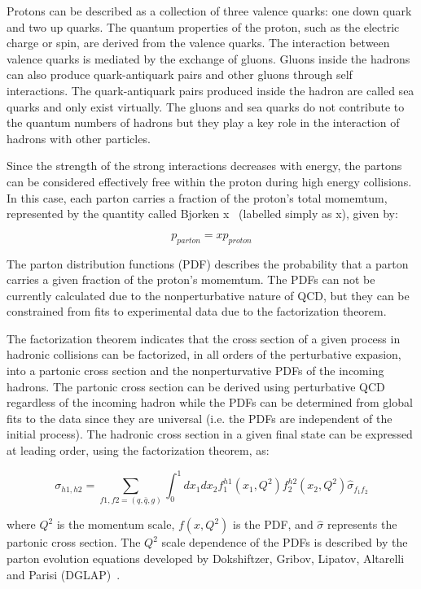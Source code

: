 Protons can be described as a collection of three valence quarks: one down quark and two up quarks. The quantum properties of the proton, such as the electric charge or spin, are derived from the valence quarks. The interaction between valence quarks is mediated by the exchange of gluons. Gluons inside the hadrons can also produce quark-antiquark pairs and other gluons through self interactions. The quark-antiquark pairs produced inside the hadron are called sea quarks and only exist virtually. The gluons and sea quarks do not contribute to the quantum numbers of hadrons but they play a key role in the interaction of hadrons with other particles.

Since the strength of the strong interactions decreases with energy,  the partons can be considered effectively free within the proton during high energy collisions. In this case, each parton carries a fraction of the proton's total momemtum, represented by the quantity called Bjorken x~\cite{BjorkenX} (labelled simply as x), given by:

\begin{equation}
p_{parton} = xp_{proton}
\end{equation}

The parton distribution functions (PDF) describes the probability that a parton carries a given fraction of the proton's momemtum. The PDFs can not be currently calculated due to the nonperturbative nature of QCD, but they can be constrained from fits to experimental data due to the factorization theorem.

The factorization theorem indicates that the cross section of a given process in hadronic collisions can be factorized, in all orders of the perturbative expasion, into a partonic cross section and the  nonperturvative PDFs of the incoming hadrons. The partonic cross section can be derived using perturbative QCD regardless of the incoming hadron while the PDFs can be determined from global fits to the data since they are universal (i.e. the PDFs are independent of the initial process). The hadronic cross section in a given final state can be expressed at leading order, using the factorization theorem, as:

\begin{equation}
\sigma_{h1,h2} = \sum_{f1,f2=(q,\bar{q},g)}\int_{0}^{1}dx_{1}dx_{2}f_{1}^{h1}\left(x_{1},Q^{2}\right)f_{2}^{h2}\left(x_{2},Q^{2}\right)\hat{\sigma}_{f_{1}f_{2}}
\label{eq:FactTheorem}
\end{equation}

where $Q^{2}$ is the momentum scale, $f\left(x,Q^{2}\right)$ is the PDF, and $\hat{\sigma}$ represents the partonic cross section. The $Q^{2}$ scale dependence of the PDFs is described by the parton evolution equations developed by Dokshiftzer, Gribov, Lipatov, Altarelli and Parisi (DGLAP)~\cite{DGLAP_1,DGLAP_2,DGLAP_3}. 

